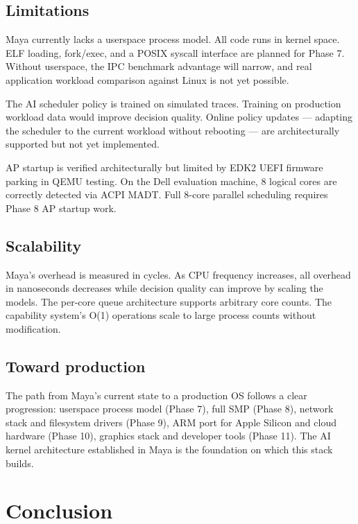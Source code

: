 \documentclass[letterpaper,twocolumn,10pt]{article}
\begin{document}
\subsection{Limitations}

Maya currently lacks a userspace process model.
All code runs in kernel space. ELF loading,
fork/exec, and a POSIX syscall interface are
planned for Phase 7. Without userspace, the
IPC benchmark advantage will narrow, and
real application workload comparison against
Linux is not yet possible.

The AI scheduler policy is trained on simulated
traces. Training on production workload data
would improve decision quality. Online policy
updates --- adapting the scheduler to the
current workload without rebooting --- are
architecturally supported but not yet
implemented.

AP startup is verified architecturally but
limited by EDK2 UEFI firmware parking in
QEMU testing. On the Dell evaluation machine,
8 logical cores are correctly detected via
ACPI MADT. Full 8-core parallel scheduling
requires Phase 8 AP startup work.

\subsection{Scalability}

Maya's overhead is measured in cycles. As CPU
frequency increases, all overhead in nanoseconds
decreases while decision quality can improve
by scaling the models. The per-core queue
architecture supports arbitrary core counts.
The capability system's O(1) operations scale
to large process counts without modification.

\subsection{Toward production}

The path from Maya's current state to a
production OS follows a clear progression:
userspace process model (Phase 7), full SMP
(Phase 8), network stack and filesystem
drivers (Phase 9), ARM port for Apple Silicon
and cloud hardware (Phase 10), graphics stack
and developer tools (Phase 11). The AI kernel
architecture established in Maya is the
foundation on which this stack builds.

\section{Conclusion}
\end{document}
